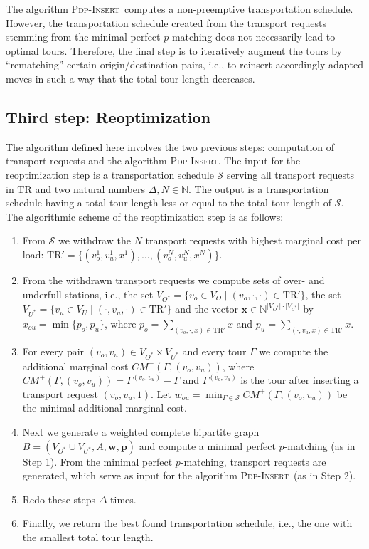 \documentclass[english]{llncs}
\numberwithin{sublemma}{lemma}
\newcommand{\abs}[1]{\ensuremath{\lvert #1 \rvert}}
\newcommand{\NN}{\ensuremath{\mathbb{N}}}
\newcommand{\tourd}{\ensuremath{\Gamma}}
\newcommand{\sched}{\mathcal{S}}
\newcommand{\TR}{\mathrm{TR}}
\newcommand{\PDPINSERT}{\textsc{Pdp-Insert}\xspace}
\newcommand{\VO}{V_O}
\newcommand{\VU}{V_U}
\begin{document}
The algorithm \PDPINSERT\ computes a non-preemptive transportation schedule. 
However, the transportation schedule created from the transport requests stemming from the minimal perfect $p$-matching does not necessarily lead to optimal tours.
Therefore, the final step is to iteratively augment the tours by ``rematching'' certain origin/destination pairs,
i.e., to reinsert accordingly adapted moves in such a way that the total tour length decreases.




\subsection{Third step: Reoptimization}


The algorithm defined here involves the two previous steps: computation of transport requests and the algorithm \PDPINSERT.
The input for the reoptimization step is a transportation schedule $\sched$ serving all transport requests in $\TR$ and two natural numbers $\Delta, N \in \NN$.
The output is a transportation schedule having a total tour length less or equal to the total tour length of $\sched$.
The algorithmic scheme of the reoptimization step is as follows:
\begin{enumerate}
 \item From $\sched$ we withdraw the $N$ transport requests with highest marginal cost per load: $\TR' = \{ (v_o^1, v_u^1, x^1), \dotsc, (v_o^N, v_u^N, x^N) \}$.
 \item From the withdrawn transport requests we compute sets of over- and underfull stations, i.e.,
       the set $V_{O^*} = \{ v_o \in \VO \mid (v_o, \cdot, \cdot) \in \TR' \}$, the set $V_{U^*} = \{ v_u \in \VU \mid (\cdot, v_u, \cdot) \in \TR' \}$ and the vector $\boldsymbol{x} \in \NN^{\abs{V_{O^*}} \cdot \abs{V_{U^*}}}$
       by $x_{ou} = \min\{ p_o, p_u \}$, where $p_o = \sum_{(v_o, \cdot, x) \in \TR'} x$ and $p_u = \sum_{(\cdot, v_u, x) \in \TR'} x$.
 \item For every pair $(v_o, v_u) \in V_{O^*} \times V_{U^*}$ and every tour $\tourd$ we compute the additional marginal cost $CM^+(\tourd, (v_o,v_u))$, where $CM^+(\tourd, (v_o,v_u)) = \tourd^{(v_o,v_u)} - \tourd$
       and $\tourd^{(v_o,v_u)}$ is the tour after inserting a transport request $(v_o, v_u, 1)$.
       Let $w_{ou} = \min_{\tourd \in \sched} CM^+(\tourd, (v_o,v_u))$ be the minimal additional marginal cost.
 \item Next we generate a weighted complete bipartite graph $B = (V_{O^*} \cup V_{U^*}, A, \boldsymbol{w}, \boldsymbol{p})$ and compute a minimal perfect $p$-matching (as in Step 1).
       From the minimal perfect $p$-matching, transport requests are generated, which serve as input for the algorithm \PDPINSERT\ (as in Step 2).
 \item Redo these steps $\Delta$ times.
 \item Finally, we return the best found transportation schedule, i.e., the one with the smallest total tour length.
\end{enumerate}
\end{document}
